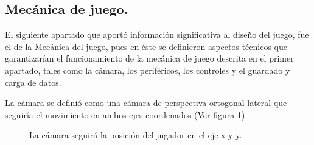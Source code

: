 \subsection{Mecánica de juego.}
El siguiente apartado que aportó información significativa al diseño del juego, 
fue el de la Mecánica del juego, pues en éste se definieron aspectos técnicos 
que garantizarían el funcionamiento de la mecánica de juego descrita en el 
primer apartado, tales como la cámara, los periféricos, los controles y el 
guardado y carga de datos. 
\\
\par
La cámara se definió como una cámara de perspectiva ortogonal lateral que seguiría 
el movimiento en ambos ejes coordenados (Ver figura \ref{fig:Camara}).

\begin{figure}
  \centering
  \caption{La cámara seguirá la posición del jugador en el eje x y y.}
  \label{fig:Camara}
\end{figure} 
 

